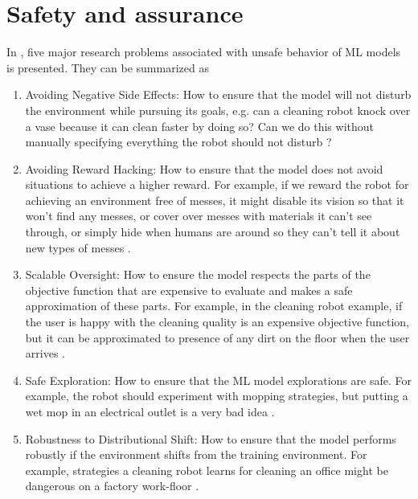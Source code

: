 \chapter{Safety and assurance}

In \cite{Amodei}, five major research problems associated with unsafe behavior of ML models is presented. They can be summarized as
\begin{enumerate}
	\item Avoiding Negative Side Effects: How to ensure that the model will not disturb the environment while pursuing its goals, e.g. can a cleaning robot knock over a vase because it can clean faster by doing so? Can we do this without manually specifying everything the robot should not disturb \cite{Amodei}?
	
	\item Avoiding Reward Hacking: How to ensure that the model does not avoid situations to achieve a higher reward. For example, if we reward the robot for achieving an environment free of messes, it might disable its vision so that it won’t find any messes, or cover over messes with materials it can’t see through, or simply hide when humans are around so they can’t tell it about new types of messes \cite{Amodei}. 
	
	\item Scalable Oversight: How to ensure the model respects the parts of the objective function that are expensive to evaluate and makes a safe approximation of these parts. 
	For example, in the cleaning robot example, if the user is happy with the cleaning quality is an expensive objective function, but it can be approximated to presence of any dirt on the floor when the user arrives \cite{Amodei}. 
	
	\item Safe Exploration: How to ensure that the ML model explorations are safe. For example, the robot should experiment with mopping strategies, but putting a wet mop in an electrical outlet is a very bad idea \cite{Amodei}. 
	
	\item Robustness to Distributional Shift: How to ensure that the model performs robustly if the environment shifts from the training environment. For example, strategies a cleaning robot learns for cleaning an office might be dangerous on a factory work-floor \cite{Amodei}.

\end{enumerate}